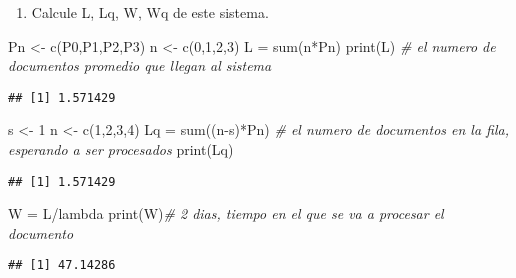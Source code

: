 \documentclass[
]{article}
\newenvironment{Shaded}{\begin{snugshade}}{\end{snugshade}}
\newcommand{\CommentTok}[1]{\textcolor[rgb]{0.56,0.35,0.01}{\textit{#1}}}
\newcommand{\DecValTok}[1]{\textcolor[rgb]{0.00,0.00,0.81}{#1}}
\newcommand{\FunctionTok}[1]{\textcolor[rgb]{0.00,0.00,0.00}{#1}}
\newcommand{\NormalTok}[1]{#1}
\newcommand{\OtherTok}[1]{\textcolor[rgb]{0.56,0.35,0.01}{#1}}
\newcommand{\SpecialCharTok}[1]{\textcolor[rgb]{0.00,0.00,0.00}{#1}}
\providecommand{\tightlist}{%
  \setlength{\itemsep}{0pt}\setlength{\parskip}{0pt}}
\begin{document}
\begin{enumerate}
\def\labelenumi{\alph{enumi})}
\setcounter{enumi}{1}
\tightlist
\item
  Calcule L, Lq, W, Wq de este sistema.
\end{enumerate}

\begin{Shaded}
\begin{Highlighting}[]
\NormalTok{Pn }\OtherTok{\textless{}{-}} \FunctionTok{c}\NormalTok{(P0,P1,P2,P3)}
\NormalTok{n }\OtherTok{\textless{}{-}} \FunctionTok{c}\NormalTok{(}\DecValTok{0}\NormalTok{,}\DecValTok{1}\NormalTok{,}\DecValTok{2}\NormalTok{,}\DecValTok{3}\NormalTok{)}
\NormalTok{L }\OtherTok{=} \FunctionTok{sum}\NormalTok{(n}\SpecialCharTok{*}\NormalTok{Pn)}
\FunctionTok{print}\NormalTok{(L) }\CommentTok{\# el numero de documentos promedio que llegan al sistema}
\end{Highlighting}
\end{Shaded}

\begin{verbatim}
## [1] 1.571429
\end{verbatim}

\begin{Shaded}
\begin{Highlighting}[]
\NormalTok{s }\OtherTok{\textless{}{-}} \DecValTok{1}
\NormalTok{n }\OtherTok{\textless{}{-}} \FunctionTok{c}\NormalTok{(}\DecValTok{1}\NormalTok{,}\DecValTok{2}\NormalTok{,}\DecValTok{3}\NormalTok{,}\DecValTok{4}\NormalTok{)}
\NormalTok{Lq }\OtherTok{=} \FunctionTok{sum}\NormalTok{((n}\SpecialCharTok{{-}}\NormalTok{s)}\SpecialCharTok{*}\NormalTok{Pn) }\CommentTok{\# el numero de documentos en la fila, esperando a ser procesados}
\FunctionTok{print}\NormalTok{(Lq)}
\end{Highlighting}
\end{Shaded}

\begin{verbatim}
## [1] 1.571429
\end{verbatim}

\begin{Shaded}
\begin{Highlighting}[]
\NormalTok{W }\OtherTok{=}\NormalTok{ L}\SpecialCharTok{/}\NormalTok{lambda}
\FunctionTok{print}\NormalTok{(W)}\CommentTok{\# 2 dias, tiempo en el que se va a procesar el documento}
\end{Highlighting}
\end{Shaded}

\begin{verbatim}
## [1] 47.14286
\end{verbatim}
\end{document}
